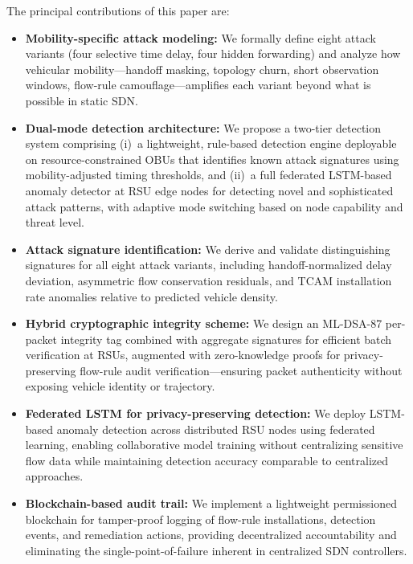 \documentclass[12pt, a4paper]{report}
\begin{document}
The principal contributions of this paper are:
\begin{itemize}
    \item \textbf{Mobility-specific attack modeling:} We formally define 
    eight attack variants (four selective time delay, four hidden 
    forwarding) and analyze how vehicular mobility---handoff masking, 
    topology churn, short observation windows, flow-rule 
    camouflage---amplifies each variant beyond what is possible in 
    static SDN.
    
    \item \textbf{Dual-mode detection architecture:} We propose a 
    two-tier detection system comprising (i)~a lightweight, rule-based 
    detection engine deployable on resource-constrained OBUs that 
    identifies known attack signatures using mobility-adjusted timing 
    thresholds, and (ii)~a full federated LSTM-based anomaly detector 
    at RSU edge nodes for detecting novel and sophisticated attack 
    patterns, with adaptive mode switching based on node capability 
    and threat level.
    
    \item \textbf{Attack signature identification:} We derive and 
    validate distinguishing signatures for all eight attack variants, 
    including handoff-normalized delay deviation, asymmetric flow 
    conservation residuals, and TCAM installation rate anomalies 
    relative to predicted vehicle density.
    
    \item \textbf{Hybrid cryptographic integrity scheme:} We design 
    an ML-DSA-87 per-packet integrity tag combined with aggregate 
    signatures for efficient batch verification at RSUs, augmented 
    with zero-knowledge proofs for privacy-preserving flow-rule 
    audit verification---ensuring packet authenticity without 
    exposing vehicle identity or trajectory.
    
    \item \textbf{Federated LSTM for privacy-preserving detection:} 
    We deploy LSTM-based anomaly detection across distributed RSU 
    nodes using federated learning, enabling collaborative model 
    training without centralizing sensitive flow data while 
    maintaining detection accuracy comparable to centralized 
    approaches.
    
    \item \textbf{Blockchain-based audit trail:} We implement a 
    lightweight permissioned blockchain for tamper-proof logging of 
    flow-rule installations, detection events, and remediation 
    actions, providing decentralized accountability and eliminating 
    the single-point-of-failure inherent in centralized SDN 
    controllers.
\end{itemize}
\end{document}
